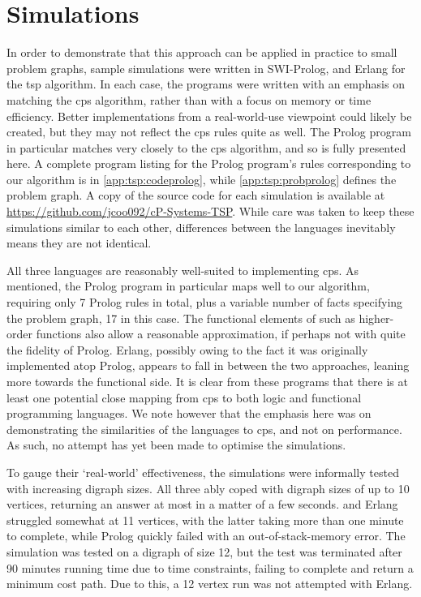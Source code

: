 \section{\label{sec:tsp:simulation}Simulations}
In order to demonstrate that this approach can be applied in practice to small problem graphs, sample simulations were written in SWI-Prolog, \fsharp{} and Erlang for the \gls{tsp} algorithm.  In each case, the programs were written with an emphasis on matching the \gls{cps} algorithm, rather than with a focus on memory or time efficiency.  Better implementations from a real-world-use viewpoint could likely be created, but they may not reflect the \gls{cps} rules quite as well.  The Prolog program in particular matches very closely to the \gls{cps} algorithm, and so is fully presented here.  A complete program listing for the Prolog program's rules corresponding to our algorithm is in \autoref{app:tsp:codeprolog}, while \autoref{app:tsp:probprolog} defines the problem graph.  A copy of the source code for each simulation is available at \url{https://github.com/jcoo092/cP-Systems-TSP}.  While care was taken to keep these simulations similar to each other, differences between the languages inevitably means they are not identical.

All three languages are reasonably well-suited to implementing \gls{cps}.  As mentioned, the Prolog program in particular maps well to our algorithm, requiring only 7 Prolog rules in total, plus a variable number of facts specifying the problem graph, 17 in this case.  The functional elements of \fsharp{} such as higher-order functions also allow a reasonable approximation, if perhaps not with quite the fidelity of Prolog.  Erlang, possibly owing to the fact it was originally implemented atop Prolog, appears to fall in between the two approaches, leaning more towards the functional side.  It is clear from these programs that there is at least one potential close mapping from \gls{cps} to both logic and functional programming languages.  We note however that the emphasis here was on demonstrating the similarities of the languages to \gls{cps}, and not on performance.  As such, no attempt has yet been made to optimise the simulations.

To gauge their `real-world' effectiveness, the simulations were informally tested with increasing digraph sizes.  All three ably coped with digraph sizes of up to 10 vertices, returning an answer at most in a matter of a few seconds.  \fsharp{} and Erlang struggled somewhat at 11 vertices, with the latter taking more than one minute to complete, while Prolog quickly failed with an out-of-stack-memory error.  The \fsharp{} simulation was tested on a digraph of size 12, but the test was terminated after 90 minutes running time due to time constraints, failing to complete and return a minimum cost path.  Due to this, a 12 vertex run was not attempted with Erlang.

